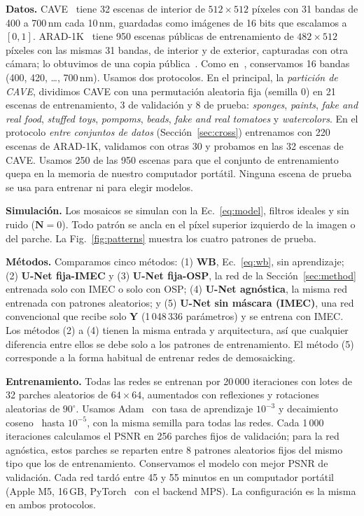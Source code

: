 \documentclass{article}
\def\Y{{\mathbf Y}}
\def\N{{\mathbf N}}
\begin{document}
\textbf{Datos.} CAVE~\cite{yasuma2010} tiene 32 escenas de interior de
$512\times512$ píxeles con 31 bandas de 400 a 700\,nm cada 10\,nm, guardadas
como imágenes de 16 bits que escalamos a $[0,1]$. ARAD-1K~\cite{arad2022}
tiene 950 escenas públicas de entrenamiento de $482\times512$ píxeles con
las mismas 31 bandas, de interior y de exterior, capturadas con otra cámara;
lo obtuvimos de una copia pública~\cite{he2023zenodo}. Como
en~\cite{diaz2023}, conservamos 16 bandas (400, 420, \dots, 700\,nm). Usamos
dos protocolos. En el principal, la \emph{partición de CAVE}, dividimos CAVE
con una permutación aleatoria fija (semilla 0) en 21 escenas de
entrenamiento, 3 de validación y 8 de prueba: \textit{sponges},
\textit{paints}, \textit{fake and real food}, \textit{stuffed toys},
\textit{pompoms}, \textit{beads}, \textit{fake and real tomatoes} y
\textit{watercolors}. En el protocolo \emph{entre conjuntos de datos}
(Sección~\ref{sec:cross}) entrenamos con 220 escenas de ARAD-1K, validamos
con otras 30 y probamos en las 32 escenas de CAVE. Usamos 250 de las 950
escenas para que el conjunto de entrenamiento quepa en la memoria de nuestro
computador portátil. Ninguna escena de prueba se usa para entrenar ni para
elegir modelos.

\textbf{Simulación.} Los mosaicos se simulan con la Ec.~\eqref{eq:model},
filtros ideales y sin ruido ($\N=0$). Todo patrón se ancla en el píxel
superior izquierdo de la imagen o del parche. La Fig.~\ref{fig:patterns}
muestra los cuatro patrones de prueba.

\textbf{Métodos.} Comparamos cinco métodos: (1) \textbf{WB},
Ec.~\eqref{eq:wb}, sin aprendizaje; (2) \textbf{U-Net fija-IMEC} y
(3) \textbf{U-Net fija-OSP}, la red de la Sección~\ref{sec:method} entrenada
solo con IMEC o solo con OSP; (4) \textbf{U-Net agnóstica}, la misma red
entrenada con patrones aleatorios; y (5) \textbf{U-Net sin máscara (IMEC)},
una red convencional que recibe solo $\Y$ (1\,048\,336 parámetros) y se
entrena con IMEC. Los métodos (2) a (4) tienen la misma entrada y
arquitectura, así que cualquier diferencia entre ellos se debe solo a los
patrones de entrenamiento. El método (5) corresponde a la forma habitual de
entrenar redes de demosaicking.

\textbf{Entrenamiento.} Todas las redes se entrenan por 20\,000 iteraciones
con lotes de 32 parches aleatorios de $64\times64$, aumentados con
reflexiones y rotaciones aleatorias de $90^\circ$. Usamos
Adam~\cite{kingma2015} con tasa de aprendizaje $10^{-3}$ y decaimiento
coseno~\cite{loshchilov2017} hasta $10^{-5}$, con la misma semilla para
todas las redes. Cada 1\,000 iteraciones calculamos el PSNR en 256 parches
fijos de validación; para la red agnóstica, estos parches se reparten entre
8 patrones aleatorios fijos del mismo tipo que los de entrenamiento.
Conservamos el modelo con mejor PSNR de validación. Cada red tardó entre 45
y 55 minutos en un computador portátil (Apple M5, 16\,GB,
PyTorch~\cite{paszke2019} con el backend MPS). La configuración es la misma
en ambos protocolos.
\end{document}
